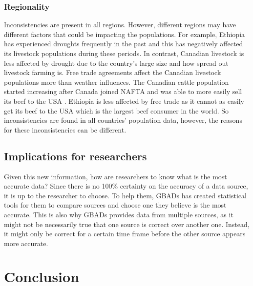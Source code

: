 \documentclass{article}
\begin{document}
\subsubsection{Regionality}
Inconsistencies are present in all regions. However, different regions may have different factors that could be impacting the populations. For example, Ethiopia has experienced droughts frequently in the past \cite{eth} and this has negatively affected its livestock populations during these periods. In contrast, Canadian livestock is less affected by drought due to the country's large size and how spread out livestock farming is. Free trade agreements affect the Canadian livestock populations more than weather influences. The Canadian cattle population started increasing after Canada joined NAFTA and was able to more easily sell its beef to the USA \cite{NAFTA}. Ethiopia is less affected by free trade as it cannot as easily get its beef to the USA which is the largest beef consumer in the world. So inconsistencies are found in all countries' population data, however, the reasons for these inconsistencies can be different.

\subsection{Implications for researchers}
Given this new information, how are researchers to know what is the most accurate data? Since there is no 100\% certainty on the accuracy of a data source, it is up to the researcher to choose. To help them, GBADs has created statistical tools for them to compare sources and choose one they believe is the most accurate. This is also why GBADs provides data from multiple sources, as it might not be necessarily true that one source is correct over another one. Instead, it might only be correct for a certain time frame before the other source appears more accurate.

\section{Conclusion}
\end{document}
